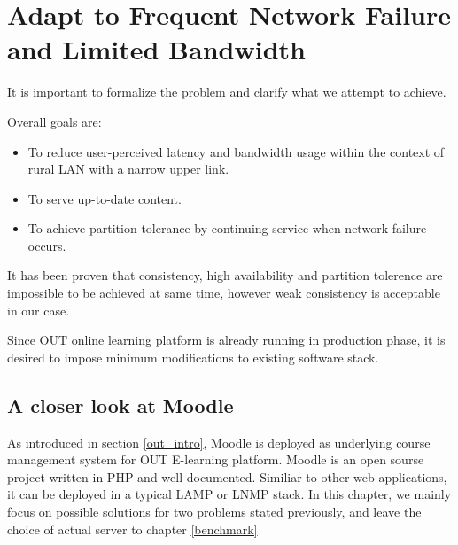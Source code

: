 \chapter{Adapt to Frequent Network Failure and Limited Bandwidth}
It is important to formalize the problem and clarify what we attempt to achieve.



Overall goals are:
\begin{itemize}
\item To reduce user-perceived latency and bandwidth usage within the context of rural LAN with a narrow upper link.
\item To serve up-to-date content.
\item To achieve partition tolerance by continuing service when network failure occurs.
\end{itemize}

It has been proven that consistency, high availability and partition tolerence are impossible to be achieved at same time\cite{brewer2000towards}\cite{gilbert2002brewer}, however weak consistency is acceptable in our case. 

Since OUT online learning platform is already running in production phase, it is desired to impose minimum modifications to existing software stack.

\section{A closer look at Moodle} \label{components}
As introduced in section \ref{out_intro}, Moodle is deployed as underlying course management system for OUT E-learning platform. Moodle is an open sourse project written in PHP and well-documented\cite{aosamoodle}\cite{moodledoc}. Similiar to other web applications, it can be deployed in a typical LAMP or LNMP stack. In this chapter, we mainly focus on possible solutions for two problems stated previously, and leave the choice of actual server to chapter \ref{benchmark}

